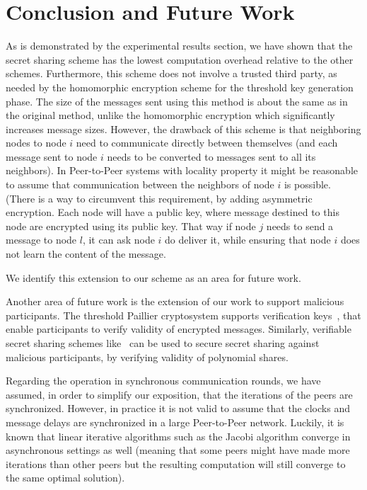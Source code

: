 \documentclass[times, 10pt,twocolumn]{article}
\begin{document}
\section{Conclusion and Future Work}
\label{Conclusion} As is demonstrated by the experimental results
section, we have shown that the secret sharing scheme has the lowest computation
overhead relative to the other schemes. Furthermore, this scheme does not
involve a trusted third party, as needed by the homomorphic
encryption scheme for the threshold key generation phase. The
size of the messages sent using this method is about the same as in
the original method,
unlike the homomorphic encryption which significantly increases
message sizes. However, the  drawback of this scheme is that
neighboring nodes to node $i$ need to communicate directly between
themselves (and each message sent to node $i$ needs to be converted to
messages sent to all its neighbors). In Peer-to-Peer systems with locality property it
might be reasonable to assume that communication between the neighbors
of node $i$ is possible.
(There is a way to circumvent this requirement, by adding
asymmetric encryption. Each node will have a public key, where
message destined to this node are encrypted using its public key.
That way if node $j$ needs to send a message to node $l$, it can ask
node $i$ do deliver it, while ensuring that node $i$ does not learn
the  content of the message.
We identify this
extension to our scheme as an area for future work.

Another area of future work is the extension of our work to
support malicious participants. The threshold Paillier
cryptosystem supports verification keys~\cite{Paillier2}, that
enable participants  to verify validity of encrypted messages.
Similarly, verifiable secret sharing schemes
like~\cite{ProactiveSS} can be used to secure secret sharing
against malicious participants, by verifying validity of
polynomial shares.

Regarding the operation in synchronous communication rounds, we
have assumed,  in order to simplify our exposition, that the
iterations of the peers are synchronized.
However, in practice it is not  valid to assume  that the clocks and message delays are synchronized in
a large Peer-to-Peer network. Luckily, it is known that linear
iterative algorithms such as the Jacobi algorithm
converge in asynchronous settings as well (meaning  that some
peers might have made more iterations than other peers but the
resulting computation will still converge to the same optimal
solution).



\end{document}
